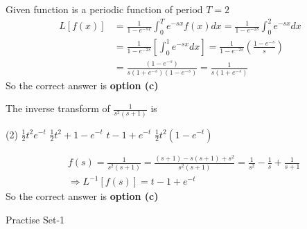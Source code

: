 \begin{answer}
	Given function is a periodic function of period $T=2$
	\begin{align*}
	L[f(x)] &=\frac{1}{1-e^{-s T}} \int_{0}^{T} e^{-s x} f(x) d x=\frac{1}{1-e^{-2 s}} \int_{0}^{2} e^{-s x} d x \\
	&=\frac{1}{1-e^{-2 s}}\left[\int_{0}^{1} e^{-s x} d x\right]=\frac{1}{1-e^{-2 s}}\left(\frac{1-e^{-s}}{s}\right) \\
	&=\frac{\left(1-e^{-s}\right)}{s\left(1+e^{-s}\right)\left(1-e^{-s}\right)}=\frac{1}{s\left(1+e^{-s}\right)}
	\end{align*}
	So the correct answer is \textbf{option (c)}
\end{answer}
\begin{exercise}
	The inverse transform of $\frac{1}{s^2(s+1)}$ is
	\begin{tasks}(2)
		\task[\textbf{a.}]$\frac{1}{2} t^{2} e^{-t}$
		\task[\textbf{b.}]$\frac{1}{2} t^{2}+1-e^{-t}$
		\task[\textbf{c.}]$t-1+e^{-t}$
		\task[\textbf{d.}] $\frac{1}{2} t^{2}\left(1-e^{-t}\right)$ 
	\end{tasks}
\end{exercise}
\begin{answer}
	\begin{align*}
	&f(s)=\frac{1}{s^{2}(s+1)}=\frac{(s+1)-s(s+1)+s^{2}}{s^{2}(s+1)}=\frac{1}{s^{2}}-\frac{1}{s}+\frac{1}{s+1} \\
	&\Rightarrow L^{-1}[f(s)]=t-1+e^{-t}
	\end{align*}
	So the correct answer is \textbf{option (c)}
\end{answer}
\newpage
\begin{abox}
	Practise Set-1
\end{abox}
